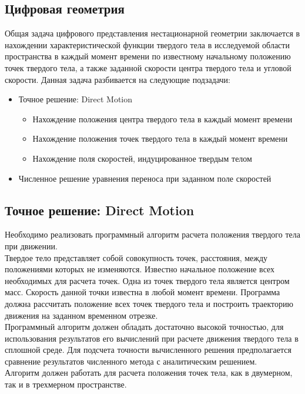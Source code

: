 \documentclass[12pt,a4paper]{article}
\begin{document}
\subsection{Цифровая геометрия}
Общая задача цифрового представления нестационарной геометрии заключается в нахождении характеристической функции твердого тела в исследуемой области пространства в каждый момент времени по известному начальному положению точек твердого тела, а также заданной скорости центра твердого тела и угловой скорости.
Данная задача разбивается на следующие подзадачи:
\begin{itemize}
  \item {Точное решение: Direct Motion}
  	\begin{itemize}
  		\item {Нахождение положения центра твердого тела в каждый момент времени}
  		\item {Нахождение положения точек твердого тела в каждый момент времени}
  		\item {Нахождение поля скоростей, индуцированное твердым телом}
  	\end{itemize}
  \item {Численное решение уравнения переноса при заданном поле скоростей}
\end{itemize}


\subsection{Точное решение: Direct Motion}
Необходимо реализовать программный алгоритм расчета положения твердого тела при движении.\\
Твердое тело представляет собой совокупность точек, расстояния, между положениями которых не изменяются. Известно начальное положение всех необходимых для расчета точек. Одна из точек твердого тела является центром масс. Скорость данной точки известна в любой момент времени. Программа должна рассчитать положение всех точек твердого тела и построить траекторию движения на заданном временном отрезке.\\
Программный алгоритм должен обладать достаточно высокой точностью, для использования результатов его вычислений при расчете движения твердого тела в сплошной среде. Для подсчета точности вычисленного решения предполагается сравнение результатов численного метода с аналитическим решением.\\
Алгоритм должен работать для расчета положения точек тела, как в двумерном, так и в трехмерном пространстве.
\end{document}
